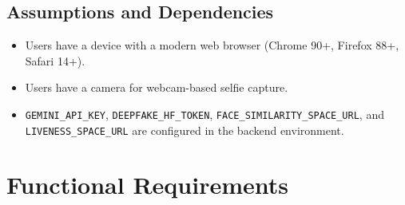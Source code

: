 \documentclass[12pt,a4paper]{report}
\begin{document}
\subsection{Assumptions and Dependencies}
\begin{itemize}
    \item Users have a device with a modern web browser (Chrome 90+, Firefox 88+, Safari 14+).
    \item Users have a camera for webcam-based selfie capture.
    \item \texttt{GEMINI\_API\_KEY}, \texttt{DEEPFAKE\_HF\_TOKEN}, \texttt{FACE\_SIMILARITY\_SPACE\_URL}, and \texttt{LIVENESS\_SPACE\_URL} are configured in the backend environment.
\end{itemize}

\section{Functional Requirements}
\end{document}
